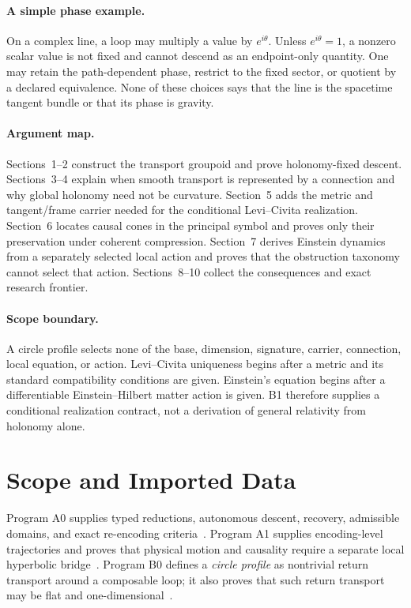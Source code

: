 \documentclass[11pt]{article}
\begin{document}
\paragraph{A simple phase example.}
On a complex line, a loop may multiply a value by $e^{i\theta}$.  Unless
$e^{i\theta}=1$, a nonzero scalar value is not fixed and cannot descend as an
endpoint-only quantity.  One may retain the path-dependent phase, restrict to
the fixed sector, or quotient by a declared equivalence.  None of these
choices says that the line is the spacetime tangent bundle or that its phase
is gravity.

\paragraph{Argument map.}
Sections~1--2 construct the transport groupoid and prove holonomy-fixed
descent.  Sections~3--4 explain when smooth transport is represented by a
connection and why global holonomy need not be curvature.  Section~5 adds the
metric and tangent/frame carrier needed for the conditional
Levi--Civita realization.  Section~6 locates causal cones in the principal
symbol and proves only their preservation under coherent compression.
Section~7 derives Einstein dynamics from a separately selected local action
and proves that the obstruction taxonomy cannot select that action.
Sections~8--10 collect the consequences and exact research frontier.

\paragraph{Scope boundary.}
A circle profile selects none of the base, dimension, signature, carrier,
connection, local equation, or action.  Levi--Civita uniqueness begins after
a metric and its standard compatibility conditions are given.  Einstein's
equation begins after a differentiable Einstein--Hilbert matter action is
given.  B1 therefore supplies a conditional realization contract, not a
derivation of general relativity from holonomy alone.

\tableofcontents
\newpage

\section{Scope and Imported Data}

Program A0 supplies typed reductions, autonomous descent, recovery, admissible
domains, and exact re-encoding criteria~\cite{A0}.  Program A1 supplies
encoding-level trajectories and proves that physical motion and causality
require a separate local hyperbolic bridge~\cite{A1}.  Program B0 defines a
\emph{circle profile} as nontrivial return transport around a composable loop;
it also proves that such return transport may be flat and
one-dimensional~\cite{B0}.
\end{document}
